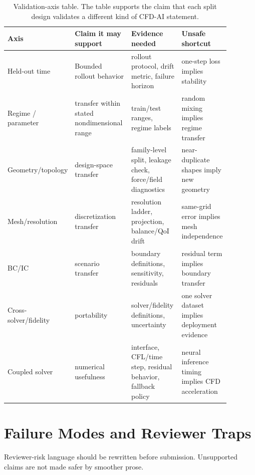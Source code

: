 \documentclass[11pt]{article}
\begin{document}
\begin{table}[h]
\centering
\small
\begin{tabular}{p{0.18\linewidth}p{0.26\linewidth}p{0.23\linewidth}p{0.21\linewidth}}
\toprule
Axis & Claim it may support & Evidence needed & Unsafe shortcut \\
\midrule
Held-out time & Bounded rollout behavior & rollout protocol, drift metric, failure horizon & one-step loss implies stability \\
Regime / parameter & transfer within stated nondimensional range & train/test ranges, regime labels & random mixing implies regime transfer \\
Geometry/topology & design-space transfer & family-level split, leakage check, force/field diagnostics & near-duplicate shapes imply new geometry \\
Mesh/resolution & discretization transfer & resolution ladder, projection, balance/QoI drift & same-grid error implies mesh independence \\
BC/IC & scenario transfer & boundary definitions, sensitivity, residuals & residual term implies boundary transfer \\
Cross-solver/fidelity & portability & solver/fidelity definitions, uncertainty & one solver dataset implies deployment evidence \\
Coupled solver & numerical usefulness & interface, CFL/time step, residual behavior, fallback policy & neural inference timing implies CFD acceleration \\
\bottomrule
\end{tabular}
\caption{Validation-axis table. The table supports the claim that each split design validates a different kind of CFD-AI statement.}
\end{table}

\section{Failure Modes and Reviewer Traps}
Reviewer-risk language should be rewritten before submission. Unsupported claims are not made safer by smoother prose.
\end{document}

